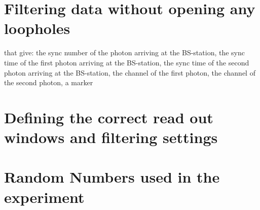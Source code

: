 \color{tudelft-cyan}
\section{Filtering data without opening any loopholes}
\color{black}


that give: the sync number of the photon arriving at the BS-station, the sync time of the first photon arriving at the BS-station, the sync time of the second photon arriving at the BS-station, the channel of the first photon, the channel of the second photon, a marker

\color{tudelft-cyan}
\section{Defining the correct read out windows and filtering settings}
\label{definitions}
\color{black}

\color{tudelft-cyan}
\section{Random Numbers used in the experiment}
\label{RN_data_used}
\color{black}
